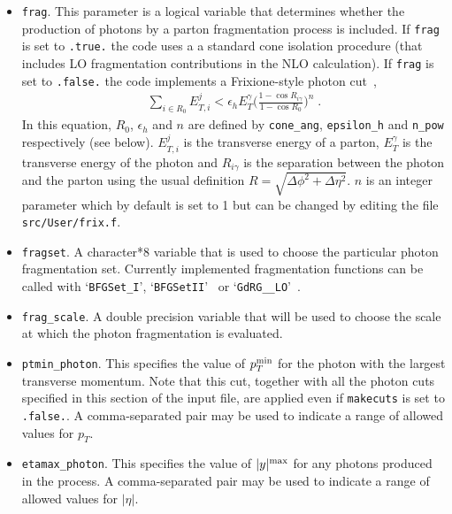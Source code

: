 \documentclass{article}
\begin{document}
\begin{itemize}
\begin{center}
\{blank line\} \\
{\tt [Settings for photon processes] }
\end{center}
\item {\tt frag}. This parameter is a logical variable that determines whether the production of photons by a parton 
fragmentation process is included. If {\tt frag} is set to {\tt .true.} the code uses a a standard cone isolation
procedure (that includes LO fragmentation contributions in the NLO calculation).
If {\tt frag} is set to {\tt .false.} the code implements
a Frixione-style photon cut~\cite{Frixione:1998jh},
\begin{eqnarray}
\sum_{i \in R_0} E_{T,i}^j  < \epsilon_h E_{T}^{\gamma} \bigg(\frac{1-\cos{R_{i\gamma}}}{1-\cos{R_0}}\bigg)^{n} \;.
\label{frixeq}
\end{eqnarray}
In this equation, $R_0$, $\epsilon_h$ and $n$ are defined by {\tt cone\_ang}, {\tt epsilon\_h} 
and {\tt n\_pow}  respectively (see below).
$E_{T,i}^{j}$ is the transverse energy of a parton, $E_{T}^\gamma$ is the
transverse energy of the photon and $R_{i\gamma}$ is the separation between the photon and the parton using the usual definition 
$R=\sqrt{\Delta\phi^2+\Delta\eta^2}$. $n$ is an integer parameter which by default is set to 1 but can be changed by editing the 
file {\tt src/User/frix.f}. 

\item {\tt fragset}. A character*8 variable that is used to choose the particular photon fragmentation set.
Currently implemented fragmentation functions can be called with `{\tt BFGSet\_I}', `{\tt BFGSetII}'~\cite{Bourhis:1997yu}
or `{\tt GdRG\_\_LO}'~\cite{GehrmannDeRidder:1998ba}.  

\item {\tt frag\_scale}. A double precision variable that will be used to choose the scale 
at which the photon fragmentation is evaluated. 

\item {\tt ptmin\_photon}. This specifies the value
of $p_T^{\rm min}$ for the photon with the largest transverse momentum.
Note that this cut, together with all the photon cuts specified in this section
of the input file, are applied even if {\tt makecuts} is set to {\tt .false.}.
A comma-separated pair may be used to indicate a range of allowed values for $p_T$.

\item {\tt etamax\_photon}. This specifies the value
of $|y|^{\rm max}$ for any photons produced in the process.
A comma-separated pair may be used to indicate a range of allowed values for $|\eta|$.


\end{itemize}
\end{document}
